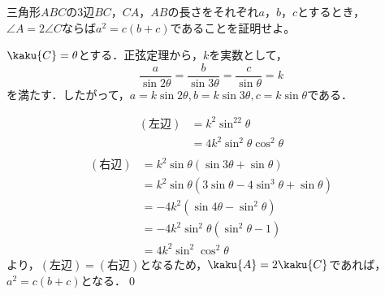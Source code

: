 
\begin{problem}
  三角形$ABC$の3辺$BC$，$CA$，$AB$の長さをそれぞれ$a$，$b$，$c$とするとき，
$\angle A=2\angle C$ならば$a^2=c(b+c)$であることを証明せよ。
\end{problem}

$\kaku{C} = \theta$とする．正弦定理から，$k$を実数として，
\[\frac{a}{\sin 2\theta} = \frac{b}{\sin3\theta} = \frac{c}{\sin \theta} = k\]
を満たす．したがって，$a = k\sin 2\theta, b = k\sin 3\theta, c= k\sin\theta$である．

\begin{align*}
  (左辺) &= k^2\sin^22\theta \\
  &= 4k^2 \sin^2\theta \cos^2\theta \\
\end{align*}
\begin{align*}
  (右辺) &= k^2 \sin \theta(\sin 3\theta + \sin \theta) \\
  &= k^2 \sin \theta(3\sin\theta-4\sin^3\theta + \sin\theta) \\
  &= -4k^2(\sin 4\theta-\sin^2\theta) \\
  &= -4k^2\sin^2\theta(\sin^2\theta-1) \\
  &= 4k^2\sin^2\cos^2\theta
\end{align*}
より，$(左辺) = (右辺)$となるため，$\kaku{A} = 2\kaku{C}$であれば，$a^2 = c(b+c)$となる．\qed
